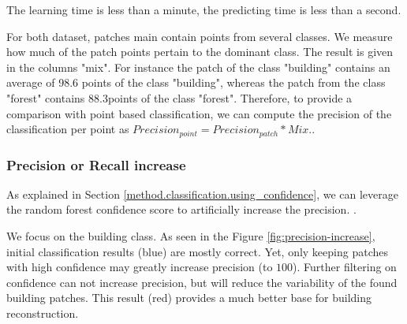 		The learning time is less than a minute, the predicting time is less than a second. 
		
		For both dataset, patches main contain points from several classes. We measure how much of the patch points pertain to the dominant class. The result is given in the columns "mix". For instance the patch of the class "building" contains an average of 98.6 \mypercent points of the class "building", whereas the patch from the class "forest" contains 88.3\mypercent points of the class "forest".
		Therefore, to provide a comparison with point based classification, we can compute the precision of the classification per point as $Precision_{point} = Precision_{patch} * Mix.$.
		
		\subsubsection{Precision or Recall increase} 
		
		As explained in Section \ref{method.classification.using_confidence}, we can leverage the random forest confidence score to artificially increase the precision.
		.
		
		We focus on the building class.
		As seen in the Figure \ref{fig:precision-increase}, initial classification results (blue) are mostly correct.
		Yet, only keeping patches with high confidence may greatly increase precision (to $100$\mypercent).
		Further filtering on confidence can not increase precision, but will reduce the variability of the found building patches. 
		This result (red) provides a much better base for building reconstruction. 
				
